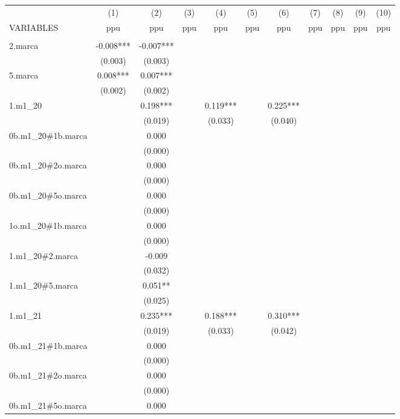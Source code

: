 \begin{tabular}{lcccccccccc} \hline
 & (1) & (2) & (3) & (4) & (5) & (6) & (7) & (8) & (9) & (10) \\
VARIABLES & ppu & ppu & ppu & ppu & ppu & ppu & ppu & ppu & ppu & ppu \\ \hline
 &  &  &  &  &  &  &  &  &  &  \\
2.marca & -0.008*** & -0.007*** &  &  &  &  &  &  &  &  \\
 & (0.003) & (0.003) &  &  &  &  &  &  &  &  \\
5.marca & 0.008*** & 0.007*** &  &  &  &  &  &  &  &  \\
 & (0.002) & (0.002) &  &  &  &  &  &  &  &  \\
1.m1\_20 &  & 0.198*** &  & 0.119*** &  & 0.225*** &  &  &  &  \\
 &  & (0.019) &  & (0.033) &  & (0.040) &  &  &  &  \\
0b.m1\_20\#1b.marca &  & 0.000 &  &  &  &  &  &  &  &  \\
 &  & (0.000) &  &  &  &  &  &  &  &  \\
0b.m1\_20\#2o.marca &  & 0.000 &  &  &  &  &  &  &  &  \\
 &  & (0.000) &  &  &  &  &  &  &  &  \\
0b.m1\_20\#5o.marca &  & 0.000 &  &  &  &  &  &  &  &  \\
 &  & (0.000) &  &  &  &  &  &  &  &  \\
1o.m1\_20\#1b.marca &  & 0.000 &  &  &  &  &  &  &  &  \\
 &  & (0.000) &  &  &  &  &  &  &  &  \\
1.m1\_20\#2.marca &  & -0.009 &  &  &  &  &  &  &  &  \\
 &  & (0.032) &  &  &  &  &  &  &  &  \\
1.m1\_20\#5.marca &  & 0.051** &  &  &  &  &  &  &  &  \\
 &  & (0.025) &  &  &  &  &  &  &  &  \\
1.m1\_21 &  & 0.235*** &  & 0.188*** &  & 0.310*** &  &  &  &  \\
 &  & (0.019) &  & (0.033) &  & (0.042) &  &  &  &  \\
0b.m1\_21\#1b.marca &  & 0.000 &  &  &  &  &  &  &  &  \\
 &  & (0.000) &  &  &  &  &  &  &  &  \\
0b.m1\_21\#2o.marca &  & 0.000 &  &  &  &  &  &  &  &  \\
 &  & (0.000) &  &  &  &  &  &  &  &  \\
0b.m1\_21\#5o.marca &  & 0.000 &  &  &  &  &  &  &  &  \\

\end{tabular}
